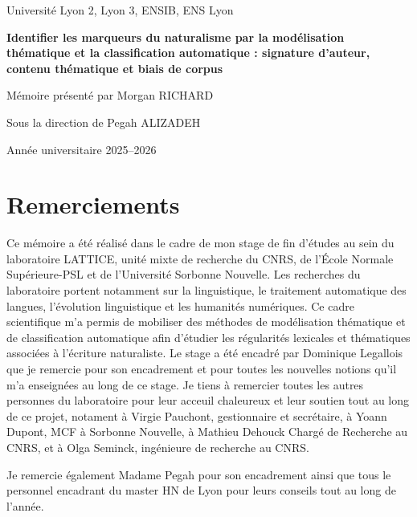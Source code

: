 \documentclass[12pt,a4paper,oneside]{report}
\begin{document}

\begin{titlepage}
    \centering
    {\Large Université Lyon 2, Lyon 3, ENSIB, ENS Lyon\par}
    \vspace{2cm}
    {\Huge\bfseries Identifier les marqueurs du naturalisme par la modélisation thématique et la classification automatique : signature d’auteur, contenu thématique et biais de corpus\par}
    \vspace{2cm}
    {\Large Mémoire présenté par Morgan RICHARD\par}
    \vspace{2cm}
    {\large Sous la direction de Pegah ALIZADEH\par}
    \vfill
    {\large Année universitaire 2025--2026\par}
\end{titlepage}

\chapter*{Remerciements}

Ce mémoire a été réalisé dans le cadre de mon stage de fin d’études au sein du laboratoire LATTICE, unité mixte de recherche du CNRS, de l’École Normale Supérieure-PSL et de l’Université Sorbonne Nouvelle. Les recherches du laboratoire portent notamment sur la linguistique, le traitement automatique des langues, l’évolution linguistique et les humanités numériques. Ce cadre scientifique m’a permis de mobiliser des méthodes de modélisation thématique et de classification automatique afin d’étudier les régularités lexicales et thématiques associées à l’écriture naturaliste. Le stage a été encadré par Dominique Legallois que je remercie pour son encadrement et pour toutes les nouvelles notions qu'il m'a enseignées au long de ce stage. Je tiens à remercier toutes les autres personnes du laboratoire pour leur acceuil chaleureux et leur soutien tout au long de ce projet, notament à Virgie Pauchont, gestionnaire et secrétaire, à Yoann Dupont, MCF à Sorbonne Nouvelle, à Mathieu Dehouck Chargé de Recherche au CNRS, et à Olga Seminck, ingénieure de recherche au CNRS.

Je remercie également Madame Pegah pour son encadrement ainsi que tous le personnel encadrant du master HN de Lyon pour leurs conseils tout au long de l'année.
\end{document}
